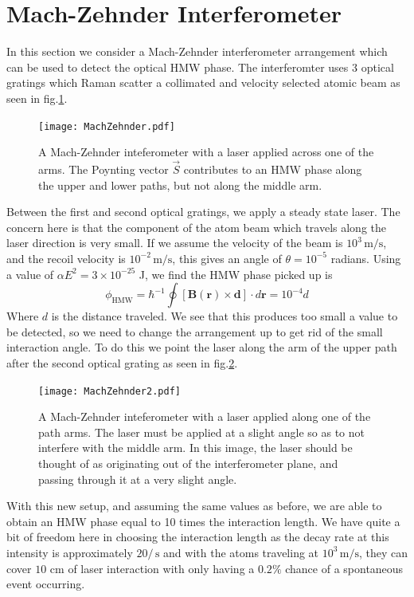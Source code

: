 \documentclass[twocolumn,english,pra,aps,superscriptaddress,floatfix]{revtex4-1}
\begin{document}
\section{Mach-Zehnder Interferometer}
\label{sec:mach}
In this section we consider a Mach-Zehnder interferometer arrangement which can be used to detect the optical HMW phase.  The interferomter uses 3 optical gratings which Raman scatter a collimated and velocity selected atomic beam as seen in fig.\ref{fig:mach}.  
\begin{figure}
\texttt{[image: MachZehnder.pdf]}
\caption{A Mach-Zehnder inteferometer with a laser applied across one of the arms. The Poynting vector $\vec{S}$ contributes to an HMW phase along the upper and lower paths, but not along the middle arm.} 
\label{fig:mach}
\end{figure}
Between the first and second optical gratings, we apply a steady state laser.  The concern here is that the component of the atom beam which travels along the laser direction is very small.  If we assume the velocity of the beam is $10^3\,\mathrm{m/s}$, and the recoil velocity is $10^{-2}\,\mathrm{m/s}$, this gives an angle of $\theta=10^{-5}$ radians.  Using a value of $\alpha E^2=3\times 10^{-25}$ J, we find the HMW phase picked up is 
\begin{equation}
\phi_{\mathrm{HMW}} = \hbar^{-1} \oint [\mathbf{B}(\mathbf{r}) \times \mathbf {d}] \cdot d \mathbf r =10^{-4}d
\end{equation}
Where $d$ is the distance traveled.  We see that this produces too small a value to be detected, so we need to change the arrangement up to get rid of the small interaction angle.  To do this we point the laser along the arm of the upper path after the second optical grating as seen in fig.\ref{fig:mach2}. 
\begin{figure}
\texttt{[image: MachZehnder2.pdf]}
\caption{A Mach-Zehnder inteferometer with a laser applied along one of the path arms.  The laser must be applied at a slight angle so as to not interfere with the middle arm.  In this image, the laser should be thought of as originating out of the interferometer plane, and passing through it at a very slight angle.} 
\label{fig:mach2}
\end{figure}
With this new setup, and assuming the same values as before, we are able to obtain an HMW phase equal to 10 times the interaction length.  We have quite a bit of freedom here in choosing the interaction length as the decay rate at this intensity is approximately $20/\,\mathrm{s}$ and with the atoms traveling at $10^3\,\mathrm{m/s}$, they can cover $10$ cm of laser interaction with only having a $0.2\%$ chance of a spontaneous event occurring.  
\end{document}
